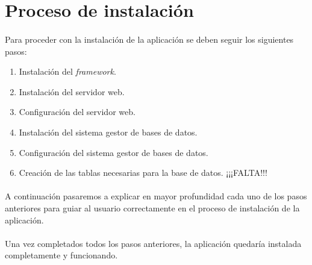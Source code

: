\section{Proceso de instalación}\label{instalacion}

  \paragraph{}Para proceder con la instalación de la aplicación se deben seguir
  los siguientes pasos:

  \begin{enumerate}
   \item Instalación del \textit{framework}.
   \item Instalación del servidor web.
   \item Configuración del servidor web.
   \item Instalación del sistema gestor de bases de datos.
   \item Configuración del sistema gestor de bases de datos.
   \item Creación de las tablas necesarias para la base de datos. ¡¡¡FALTA!!!
  \end{enumerate}

  \paragraph{}A continuación pasaremos a explicar en mayor profundidad cada
  uno de los pasos anteriores para guiar al usuario correctamente en el proceso
  de instalación de la aplicación.

  \begin{enumerate}
    
    
    
    
    
  \end{enumerate}

  \paragraph{}Una vez completados todos los pasos anteriores, la aplicación
  quedaría instalada completamente y funcionando.